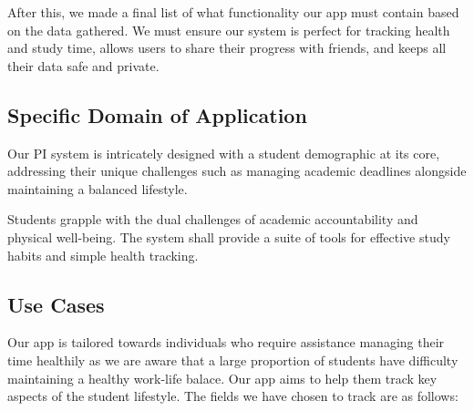 \documentclass[12pt]{article}
\begin{document}
After this, we made a final list of what functionality our app must contain based on the data gathered. We must
ensure our system is perfect for tracking health and study time, allows users
to share their progress with friends, and keeps all their data safe and
private.
 

\subsection{Specific Domain of Application}

Our PI system is intricately designed with a student demographic at its core,
addressing their unique challenges such as managing academic deadlines
alongside maintaining a balanced lifestyle.\par 

Students grapple with the dual challenges of academic accountability and
physical well-being. The system shall provide a suite of tools for effective
study habits and simple health tracking.
 

\subsection{Use Cases}

Our app is tailored towards individuals who require assistance managing their time healthily as
we are aware that a large proportion of students have difficulty maintaining a healthy work-life
balace. Our app aims to help them track key aspects of the student lifestyle.
The fields we have chosen to track are as follows:
\end{document}
